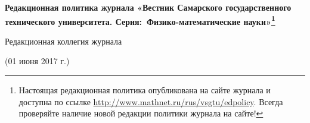 




\begin{center}



{\large \bf Редакционная политика журнала «Вестник Самарского государственного технического университета. Серия:~Физико-математические науки»\footnote{Настоящая редакционная политика опубликована на сайте журнала и доступна по ссылке \url{http://www.mathnet.ru/rus/vsgtu/edpolicy}. Всегда проверяйте наличие новой редакции политики журнала на сайте!}}



\smallskip



{\small Редакционная коллегия журнала}



\smallskip



{\small (01 июня 2017 г.)}



\end{center}





\renewcommand{\abstractname}{Общие сведения о журнале}





\small



